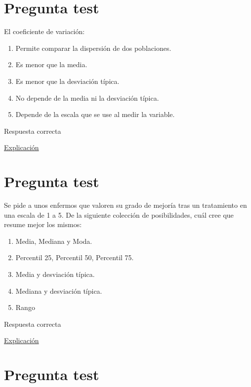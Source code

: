 \documentclass[
]{book}
\providecommand{\tightlist}{%
  \setlength{\itemsep}{0pt}\setlength{\parskip}{0pt}}
\begin{document}
\hypertarget{pregunta-test-67}{%
\section{Pregunta test}\label{pregunta-test-67}}

El coeficiente de variación:

\begin{enumerate}
\def\labelenumi{\alph{enumi})}
\tightlist
\item
  Permite comparar la dispersión de dos poblaciones.
\item
  Es menor que la media.
\item
  Es menor que la desviación típica.
\item
  No depende de la media ni la desviación típica.
\item
  Depende de la escala que se use al medir la variable.
\end{enumerate}

Respuesta correcta

\href{https://en.wikipedia.org/wiki/Coefficient_of_variation}{Explicación}

\hypertarget{pregunta-test-68}{%
\section{Pregunta test}\label{pregunta-test-68}}

Se pide a unos enfermos que valoren su grado de mejoría tras un tratamiento en una escala de 1 a 5. De la siguiente colección de posibilidades, cuál cree que resume mejor los mismos:

\begin{enumerate}
\def\labelenumi{\alph{enumi})}
\tightlist
\item
  Media, Mediana y Moda.
\item
  Percentil 25, Percentil 50, Percentil 75.
\item
  Media y desviación típica.
\item
  Mediana y desviación típica.
\item
  Rango
\end{enumerate}

Respuesta correcta

\href{https://1fjmanzano.github.io/bioestadistica/medidas-de-posicio\%CC\%81n-dispersio\%CC\%81n-y-forma.html\#medidas-de-dispersio\%CC\%81n}{Explicación}

\hypertarget{pregunta-test-69}{%
\section{Pregunta test}\label{pregunta-test-69}}
\end{document}
